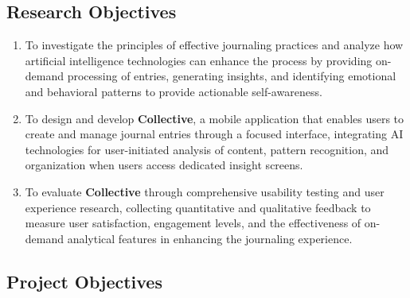 \subsection{Research Objectives}\label{subsec:research-objectives}

\begin{enumerate}
	\item To investigate the principles of effective journaling practices and analyze how artificial intelligence technologies can enhance the process by providing on-demand processing of entries, generating insights, and identifying emotional and behavioral patterns to provide actionable self-awareness.
	
	\item To design and develop \textbf{Collective}, a mobile application that enables users to create and manage journal entries through a focused interface, integrating AI technologies for user-initiated analysis of content, pattern recognition, and organization when users access dedicated insight screens.
	
	\item To evaluate \textbf{Collective} through comprehensive usability testing and user experience research, collecting quantitative and qualitative feedback to measure user satisfaction, engagement levels, and the effectiveness of on-demand analytical features in enhancing the journaling experience.
\end{enumerate}

\subsection{Project Objectives}\label{subsec:project-objectives}

